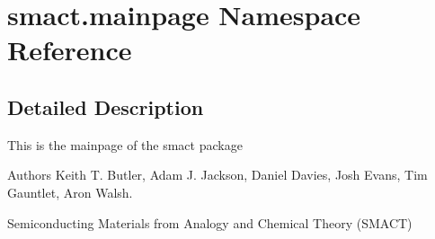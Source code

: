 \hypertarget{namespacesmact_1_1mainpage}{}\section{smact.\+mainpage Namespace Reference}
\label{namespacesmact_1_1mainpage}


\subsection{Detailed Description}
\begin{DoxyVerb}\mainpage

This is the mainpage of the smact package

Authors Keith T. Butler, Adam J. Jackson, Daniel Davies, Josh Evans, Tim Gauntlet, Aron Walsh.

Semiconducting Materials from Analogy and Chemical Theory (SMACT)
\end{DoxyVerb}
 